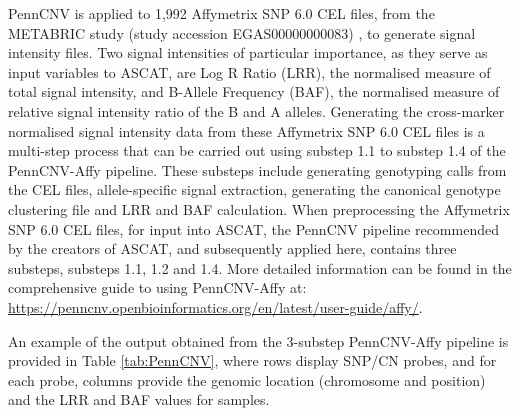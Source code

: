 PennCNV is applied to 1,992 Affymetrix SNP 6.0 CEL files, from the METABRIC study (study accession EGAS00000000083) \citep{pmid22522925, pmid26111507}, to generate signal intensity files. Two signal intensities of particular importance, as they serve as input variables to ASCAT, are Log R Ratio (LRR), the normalised measure of total signal intensity, and B-Allele Frequency (BAF), the normalised measure of relative signal intensity ratio of the B and A alleles. Generating the cross-marker normalised signal intensity data from these Affymetrix SNP 6.0 CEL files is a multi-step process that can be carried out using substep 1.1 to substep 1.4 of the PennCNV-Affy pipeline. These substeps include generating genotyping calls from the CEL files, allele-specific signal extraction, generating the canonical genotype clustering file and LRR and BAF calculation. When preprocessing the Affymetrix SNP 6.0 CEL files, for input into ASCAT, the PennCNV pipeline recommended by the creators of ASCAT, and subsequently applied here, contains three substeps, substeps 1.1, 1.2 and 1.4. More detailed information can be found in the comprehensive guide to using PennCNV-Affy at: \href{https://penncnv.openbioinformatics.org/en/latest/user-guide/affy/}{https://penncnv.openbioinformatics.org/en/latest/user-guide/affy/}.  

An example of the output obtained from the 3-substep PennCNV-Affy pipeline is provided in Table \ref{tab:PennCNV}, where rows display SNP/CN probes, and for each probe, columns provide the genomic location (chromosome and position) and the LRR and BAF values for samples. 

